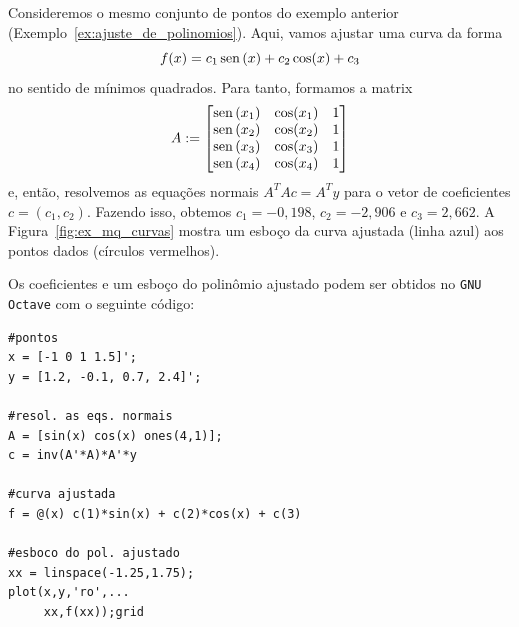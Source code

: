 \begin{ex}\label{ex:ajuste_de_curvas}
  Consideremos o mesmo conjunto de pontos do exemplo anterior (Exemplo~\ref{ex:ajuste_de_polinomios}). Aqui, vamos ajustar uma curva da forma
  \begin{equation}
    f(x) = c_1\operatorname{sen}\,(x) + c_2\cos(x) + c_3
  \end{equation}
no sentido de mínimos quadrados. Para tanto, formamos a matrix
\begin{equation}
  A :=
  \begin{bmatrix}
    \operatorname{sen}\,(x_1) & \cos(x_1) & 1 \\
    \operatorname{sen}\,(x_2) & \cos(x_2) & 1 \\
    \operatorname{sen}\,(x_3) & \cos(x_3) & 1 \\
    \operatorname{sen}\,(x_4) & \cos(x_4) & 1 \\
  \end{bmatrix}
\end{equation}
  e, então, resolvemos as equações normais $A^TAc = A^Ty$ para o vetor de coeficientes $c=(c_1, c_2)$. Fazendo isso, obtemos $c_1=-0,198$, $c_2=-2,906$ e $c_3=2,662$. A Figura~\ref{fig:ex_mq_curvas} mostra um esboço da curva ajustada (linha azul) aos pontos dados (círculos vermelhos).

\ifisoctave
Os coeficientes e um esboço do polinômio ajustado podem ser obtidos no \verb+GNU Octave+ com o seguinte código:
\begin{verbatim}
#pontos
x = [-1 0 1 1.5]';
y = [1.2, -0.1, 0.7, 2.4]';

#resol. as eqs. normais
A = [sin(x) cos(x) ones(4,1)];
c = inv(A'*A)*A'*y

#curva ajustada
f = @(x) c(1)*sin(x) + c(2)*cos(x) + c(3)

#esboco do pol. ajustado
xx = linspace(-1.25,1.75);
plot(x,y,'ro',...
     xx,f(xx));grid
\end{verbatim}
\fi


\end{ex}



